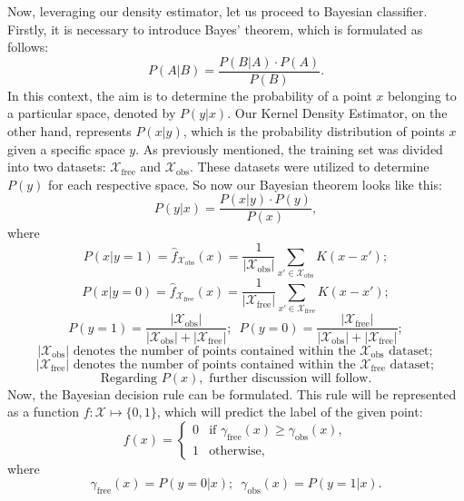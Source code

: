 \documentclass{ctuthesis}
\begin{document}
\vspace{1em}
\noindent Now, leveraging our density estimator, let us proceed to Bayesian classifier.
Firstly, it is necessary to introduce Bayes' theorem, which is formulated as follows:
\[
  P(A|B) = \frac{P(B|A) \cdot P(A)}{P(B)}.
\]
In this context, 
the aim is to determine the probability of a point \( x \) belonging to a particular space,
denoted by \( P(y|x) \). 
Our Kernel Density Estimator, on the other hand, represents \( P(x|y) \), 
which is the probability distribution of points \( x \) given a specific space \( y \).
As previously mentioned, the training set was divided into 
two datasets: \( \mathcal{X}_\text{free} \) and \( \mathcal{X}_\text{obs} \). 
These datasets were utilized to determine \( P(y) \) for each respective space.
So now our Bayesian theorem looks like this:
\[
  P(y|x) = \frac{P(x|y) \cdot P(y)}{P(x)},
\]
where
\[ P(x|y=1) = \hat{f}_{\mathcal{X}_{\text{obs}}}(x) = \frac{1}{|\mathcal{X}_{\text{obs}}|} \sum_{x' \in \mathcal{X}_{\text{obs}}} K \left( x - x' \right); \]
\[ P(x|y=0) = \hat{f}_{\mathcal{X}_{\text{free}}}(x) = \frac{1}{|\mathcal{X}_{\text{free}}|} \sum_{x' \in \mathcal{X}_{\text{free}}} K \left( x - x' \right); \]
\[ P(y=1) = \frac{|\mathcal{X}_{\text{obs}}|}{|\mathcal{X}_{\text{obs}}|+|\mathcal{X}_{\text{free}}|};\enspace
P(y=0) = \frac{|\mathcal{X}_{\text{free}}|}{|\mathcal{X}_{\text{obs}}|+|\mathcal{X}_{\text{free}}|};\]
\[|\mathcal{X}_{\text{obs}}| \text{ denotes the number of points contained within the } \mathcal{X}_{\text{obs}} \text{ dataset};\]
\[|\mathcal{X}_{\text{free}}| \text{ denotes the number of points contained within the } \mathcal{X}_{\text{free}} \text{ dataset};\]
\[\text{Regarding } P(x), \text{ further discussion will follow}.\]
Now, the Bayesian decision rule can be formulated. 
This rule will be represented as a function \( f: \mathcal{X} \mapsto \{0,1\} \), 
which will predict the label of the given point:
\[ f(x) = 
  \begin{cases}
  0 & \text{if } \gamma_{\text{free}}(x) \geq \gamma_{\text{obs}}(x), \\
  1 & \text{otherwise,}
  \end{cases} 
\]
where 
\[\gamma_{\text{free}}(x) = P(y=0|x);\enspace \gamma_{\text{obs}}(x) = P(y=1|x).\]
\end{document}
